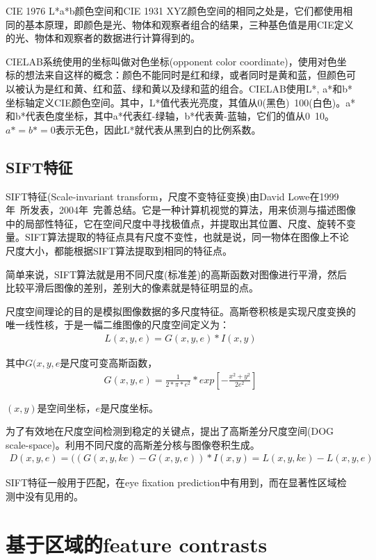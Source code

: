 \documentclass[12pt]{article}
\begin{document}
CIE 1976 L*a*b颜色空间和CIE 1931 XYZ颜色空间的相同之处是，它们都使用相同的基本原理，即颜色是光、物体和观察者组合的结果，三种基色值是用CIE定义的光、物体和观察者的数据进行计算得到的。

CIELAB系统使用的坐标叫做对色坐标(opponent color coordinate)，使用对色坐标的想法来自这样的概念：颜色不能同时是红和绿，或者同时是黄和蓝，但颜色可以被认为是红和黄、红和蓝、绿和黄以及绿和蓝的组合。CIELAB使用L*, a*和b*坐标轴定义CIE颜色空间。其中，L*值代表光亮度，其值从0(黑色)~100(白色)。a*和b*代表色度坐标，其中a*代表红-绿轴，b*代表黄-蓝轴，它们的值从0~10。$a*=b*=0$表示无色，因此L*就代表从黑到白的比例系数。

\subsection{SIFT特征}

SIFT特征(Scale-invariant transform，尺度不变特征变换)由David Lowe在1999年~\cite{lowe1999object}所发表，2004年~\cite{lowe2004distinctive}完善总结。它是一种计算机视觉的算法，用来侦测与描述图像中的局部性特征，它在空间尺度中寻找极值点，并提取出其位置、尺度、旋转不变量。SIFT算法提取的特征点具有尺度不变性，也就是说，同一物体在图像上不论尺度大小，都能根据SIFT算法提取到相同的特征点。

简单来说，SIFT算法就是用不同尺度(标准差)的高斯函数对图像进行平滑，然后比较平滑后图像的差别，差别大的像素就是特征明显的点。

尺度空间理论的目的是模拟图像数据的多尺度特征。高斯卷积核是实现尺度变换的唯一线性核，于是一幅二维图像的尺度空间定义为：
\begin{align}
L(x, y, e) = G(x, y, e) * I(x, y)
\end{align}

其中$G(x, y, e$是尺度可变高斯函数，
\begin{align}
 G(x,y,e) = \frac{1}{2*\pi *e^2} * exp[-\frac{x^2 + y^2}{2e^2}]
\end{align}

$(x, y)$是空间坐标，$e$是尺度坐标。

为了有效地在尺度空间检测到稳定的关键点，提出了高斯差分尺度空间(DOG scale-space)。利用不同尺度的高斯差分核与图像卷积生成。
\begin{align}
D(x,y,e) = ((G(x,y,ke) - G(x,y,e)) * I(x,y) = L(x,y,ke) - L(x,y,e)
\end{align}

SIFT特征一般用于匹配，在eye fixation prediction中有用到，而在显著性区域检测中没有见用的。

\section{基于区域的feature contrasts}
\end{document}
